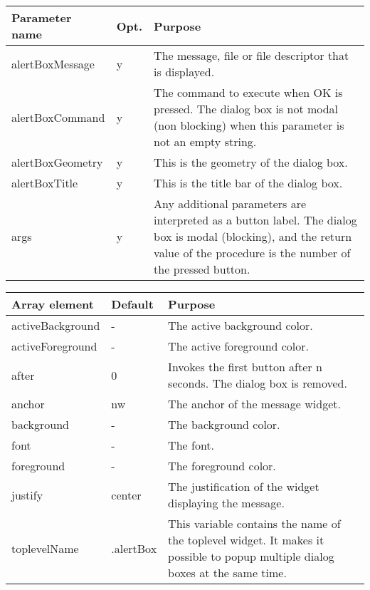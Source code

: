 {\newpage
\clearpage
\samepage \begin{tabular}{|l|l|p{6.5cm}|} \hline
Parameter name    & Opt. & Purpose\\  \hline
alertBoxMessage   & y    & The message, file or file
                           descriptor that is displayed.\\  \hline
alertBoxCommand	  & y    & The command to execute when OK is
                           pressed. The dialog box is not modal
                           (non blocking) when this parameter
                           is not an empty string.\\  \hline
alertBoxGeometry  & y    & This is the geometry of the dialog
                           box.\\  \hline
alertBoxTitle     & y    & This is the title bar of the
                           dialog box.\\  \hline
args              & y    & Any additional parameters are
                           interpreted as a button label.
                           The dialog box is modal
                           (blocking), and the return value
                           of the procedure is the number of
                           the pressed button.\\  \hline
\end{tabular}
}

{\newpage
\clearpage
\samepage \begin{tabular}{|l|l|p{5.5cm}|} \hline
Array element     & Default   & Purpose\\  \hline
activeBackground  & -         & The active background color.\\  \hline
activeForeground  & -         & The active foreground color.\\  \hline
after             & 0         & Invokes the first button after
                                n seconds. The dialog box
                                is removed.\\  \hline
anchor            & nw        & The anchor of the message widget.\\  \hline
background        & -         & The background color.\\  \hline
font              & -         & The font.\\  \hline
foreground        & -         & The foreground color.\\  \hline
justify           & center    & The justification of the
                                widget displaying the
                                message.\\  \hline
toplevelName      & .alertBox & This variable contains the
                                name of the toplevel widget.
                                It makes it possible to
                                popup multiple dialog boxes
                                at the same time.\\  \hline
\end{tabular}
}

